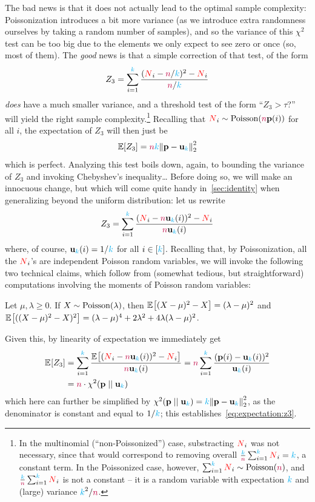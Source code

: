 The bad news is that it does not actually lead to the optimal sample complexity: Poissonization introduces a bit more variance (as we introduce extra randomness ourselves by taking a random number of samples), and so the variance of this $\chi^2$ test can be too big due to the elements we only expect to see zero or once (so, most of them). The \emph{good} news is that a simple correction of that test, of the form
\begin{equation}
    Z_3 = \sum_{i=1}^{\textcolor{cyan}{k}} \frac{(\textcolor{red}{N}_i-{\textcolor{purple}{n}}/{\textcolor{cyan}{k}})^2- \textcolor{red}{N}_i}{{\textcolor{purple}{n}}/{\textcolor{cyan}{k}}}
\end{equation}
\emph{does} have a much smaller variance, and a threshold test of the form ``$Z_3 > \tau$?'' will yield the right sample complexity.\footnote{In the multinomial (``non-Poissonized'') case, substracting $\textcolor{red}{N}_i$ was not necessary, since that would correspond to removing overall $\frac{{\textcolor{cyan}{k}}}{{\textcolor{purple}{n}}}\sum_{i=1}^{\textcolor{cyan}{k}} \textcolor{red}{N}_i = {\textcolor{cyan}{k}}$, a constant term. In the Poissonized case, however, $\sum_{i=1}^\ab \occur_i\sim\poisson{\ns}$, and $\frac{{\textcolor{cyan}{k}}}{{\textcolor{purple}{n}}}\sum_{i=1}^{\textcolor{cyan}{k}} \textcolor{red}{N}_i$ is not a constant -- it is a random variable with expectation ${\textcolor{cyan}{k}}$ and (large) variance ${\textcolor{cyan}{k}}^2/{\textcolor{purple}{n}}$.} Recalling that $\occur_i\sim\poisson{\ns\p(i)}$ for all $i$, the expectation of $Z_3$ will then just be 
\begin{equation}
  \label{eq:expectation:z3}
    \expect{Z_3} = \ns\ab \normtwo{\p-\uniform_\ab}^2
\end{equation}
which is perfect. Analyzing this test boils down, again, to bounding the variance of $Z_3$ and invoking Chebyshev's inequality\dots{} Before doing so, we will make an innocuous change, but which will come quite handy in~\cref{sec:identity} when generalizing beyond the uniform distribution: let us rewrite
\[
    Z_3 = \sum_{i=1}^{\textcolor{cyan}{k}} \frac{(\textcolor{red}{N}_i-{\textcolor{purple}{n}}\mathbf{u}_{\textcolor{cyan}{k}}(i))^2- \textcolor{red}{N}_i}{{\textcolor{purple}{n}}\mathbf{u}_{\textcolor{cyan}{k}}(i)}
\]
where, of course, $\mathbf{u}_{\textcolor{cyan}{k}}(i) = 1/{\textcolor{cyan}{k}}$ for all $i\in[{\textcolor{cyan}{k}}]$. Recalling that, by Poissonization, all the $\textcolor{red}{N}_i$'s are independent Poisson random variables, we will invoke the following two technical claims, which follow from (somewhat tedious, but straightforward) computations involving the moments of Poisson random variables:
\begin{claim}
  Let $\mu, \lambda \geq 0$. If $X\sim\poisson{\lambda}$, then 
  $
  \bEE{(X-\mu)^2-X} = (\lambda-\mu)^2
  $
  and 
  $
  \bEE{((X-\mu)^2-X)^2} = (\lambda-\mu)^4 + 2\lambda^2 + 4\lambda(\lambda-\mu)^2
  $.
\end{claim}
Given this, by linearity of expectation we immediately get
\begin{align}
    \bEE{Z_3} 
    &= \sum_{i=1}^\ab \frac{\bEE{(\occur_i-\ns\uniform_\ab(i))^2- \occur_i}}{\ns\uniform_\ab(i)}
    = \ns\sum_{i=1}^\ab \frac{(\p(i)-\uniform_\ab(i))^2}{\uniform_\ab(i)} \notag\\
    &= \ns\cdot\chisquare{\p}{\uniform_\ab} \label{eq:expectation:z3:chisquare}
\end{align}
which here can further be simplified by $\chisquare{\p}{\uniform_\ab} = \ab\normtwo{\p-\uniform_\ab}^2$, as the denominator is constant and equal to $1/{\textcolor{cyan}{k}}$; this establishes~\cref{eq:expectation:z3}.


